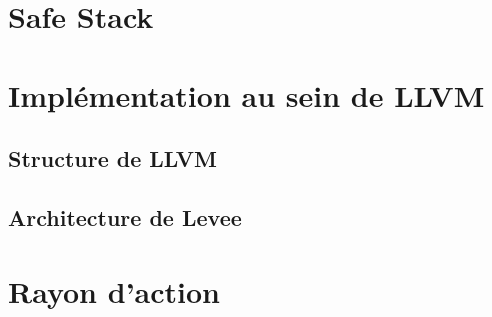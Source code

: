 \section{Safe Stack}
\label{section:safeStack}


\section{Implémentation au sein de LLVM}

%

\subsection{Structure de LLVM}


\subsection{Architecture de Levee}


\section{Rayon d'action}


